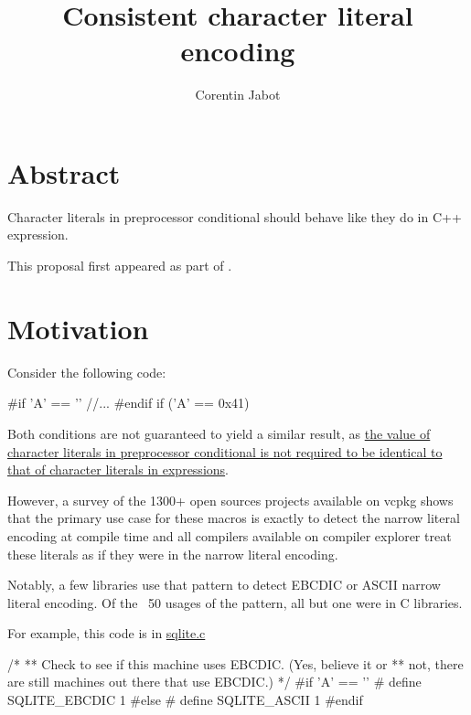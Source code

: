 \documentclass{wg21}
\title{	Consistent character literal encoding}
\author{Corentin Jabot}{corentin.jabot@gmail.com}
\begin{document}
\maketitle

\paperquote{}

\section{Abstract}

Character literals in preprocessor conditional should behave like they do in C++ expression.

This proposal first appeared as part of .

\section{Motivation}

Consider the following code:

\begin{colorblock}
#if 'A' == ''
//...
#endif
if ('A' == 0x41){}
\end{colorblock}

Both conditions are not guaranteed to yield a similar result, as \href{http://eel.is/c++draft/cpp#cond-12}{the value of character literals in preprocessor conditional is not required to be identical to that of character literals in expressions}.

However, a survey of the 1300+ open sources projects available on vcpkg shows that the primary use case for these macros is exactly to detect the
narrow literal encoding at compile time and all compilers available on compiler explorer treat these literals as if they were in the narrow literal encoding.

Notably, a few libraries use that pattern to detect EBCDIC or ASCII narrow literal encoding.
Of the ~50 usages of the pattern, all but one were in C libraries.

\begin{quoteblock}
For example, this code is in \href{https://github.com/sqlite/sqlite/blob/master/src/sqliteInt.h#L739}{sqlite.c}

\begin{colorblock}
/*
** Check to see if this machine uses EBCDIC.  (Yes, believe it or
** not, there are still machines out there that use EBCDIC.)
*/
#if 'A' == ''
# define SQLITE_EBCDIC 1
#else
# define SQLITE_ASCII 1
#endif
\end{colorblock}
\end{quoteblock}
\end{document}
